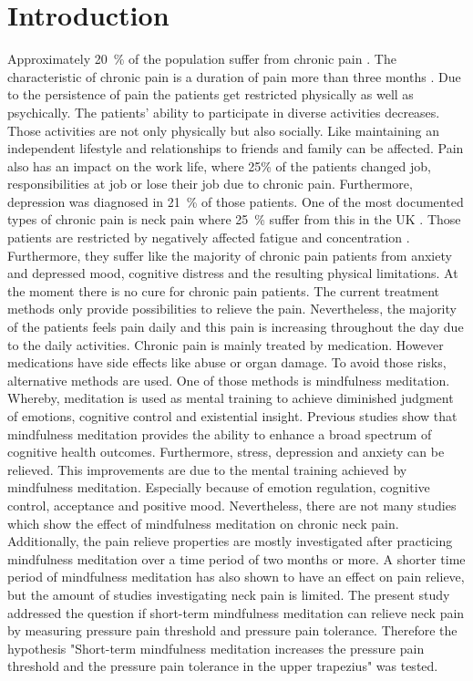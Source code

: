 \section{Introduction}
Approximately 20~\% of the population suffer from chronic pain \cite{Macfarlanea2016}. The characteristic of chronic pain is a duration of pain more than three months \cite{Mello2016}. Due to the persistence of pain the patients get restricted physically as well as psychically. The patients’ ability to participate in diverse activities decreases. Those activities are not only physically but also socially. Like maintaining an independent lifestyle and relationships to friends and family can be affected.  Pain also has an impact on the work life, where 25\% of the patients changed job, responsibilities at job or lose their job due to chronic pain. Furthermore, depression was diagnosed in 21~\% of those patients. \cite{Breivik2006}
One of the most documented types of chronic pain is neck pain where  25~\% suffer from this in the UK \cite{Macfarlanea2016}. Those patients are restricted by negatively affected fatigue and concentration \cite{Zee2016}. Furthermore, they suffer like the majority of chronic pain patients from anxiety and depressed mood, cognitive distress and the resulting physical limitations. \cite{Gross2013}
At the moment there is no cure for chronic pain patients. The current treatment methods only provide possibilities to relieve the pain. \cite{Pope2017,Dawn2009} Nevertheless, the majority of the patients feels pain daily and this pain is increasing throughout the day due to the daily activities. \cite{Breivik2006} Chronic pain is mainly treated by medication. However medications have side effects like abuse or organ damage. To avoid those risks, alternative methods are used. One of those methods is mindfulness meditation. Whereby, meditation is used as mental training to achieve diminished judgment of emotions, cognitive control and existential insight. \cite{Dawn2009}
Previous studies show that mindfulness meditation provides the ability to enhance a broad spectrum of cognitive health outcomes. Furthermore, stress, depression and anxiety can be relieved. This improvements are due to the mental training achieved by mindfulness meditation. Especially because of emotion regulation, cognitive control, acceptance and positive mood. \cite{Dawn2009,Zeidan2012} Nevertheless, there are not many studies which show the effect of mindfulness meditation on chronic neck pain. \cite{Macfarlanea2016} Additionally, the pain relieve properties are mostly investigated after practicing mindfulness meditation over a time period of two months or more.  A shorter time period of mindfulness meditation has also shown to have an effect on pain relieve, but the amount of studies investigating neck pain is limited.
The present study addressed the question if short-term mindfulness meditation can relieve neck pain by measuring pressure pain threshold and pressure pain tolerance. Therefore the hypothesis "Short-term mindfulness meditation increases the pressure pain threshold and the pressure pain tolerance in the upper trapezius" was tested.

